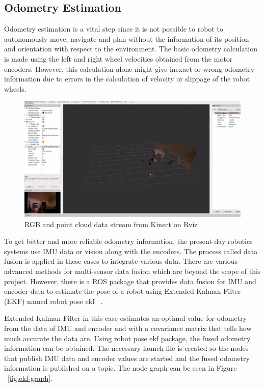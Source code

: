 	\subsection{Odometry Estimation}
	\label{subsec:odom estimation}
	Odometry estimation is a vital step since it is not possible to robot to autonomously move, navigate and plan without the information of its position and orientation with respect to the environment. The basic odometry calculation is made using the left and right wheel velocities obtained from the motor encoders. However, this calculation alone might give inexact or wrong odometry information due to errors in the calculation of velocity or slippage of the robot wheels.
		\begin{figure}[h]
			\centering
			\includegraphics[scale=0.38]{images/kinect-pcl}
			\caption{RGB and point cloud data stream from Kinect on Rviz}
			\label{fig:kinect-pcl}
		\end{figure}	
	\par
	To get better and more reliable odometry information, the present-day robotics systems use IMU data or vision along with the encoders. The process called data fusion is applied in these cases to integrate various data. There are various advanced methods for multi-sensor data fusion which are beyond the scope of this project. However, there is a ROS package that provides data fusion for IMU and encoder data to estimate the pose of a robot using Extended Kalman Filter (EKF) named robot pose ekf  ~\cite{robotPoseEkf}. 
	\par
	Extended Kalman Filter in this case estimates an optimal value for odometry from the data of IMU and encoder and with a covariance matrix that tells how much accurate the data are. Using robot pose ekf package, the fused odometry information can be obtained. The necessary launch file is created so the nodes that publish IMU data and encoder values are started and the fused odometry information is published on a topic. The node graph can be seen in Figure ~\ref{fig:ekf-graph}.

